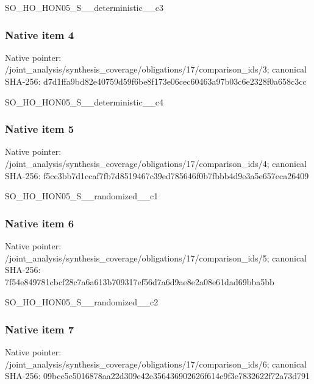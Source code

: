 \documentclass[10pt,a4paper]{article}
\begin{document}
\begingroup\raggedright\sloppy SO\_\allowbreak{}HO\_\allowbreak{}HON05\_\allowbreak{}S\_\allowbreak{}\_\allowbreak{}deterministic\_\allowbreak{}\_\allowbreak{}c3\par\endgroup

\subsubsection{Native item 4}
Native pointer: /joint\_\allowbreak{}analysis/synthesis\_\allowbreak{}coverage/obligations/17/comparison\_\allowbreak{}ids/3; canonical SHA-256: d7d1ffa9bd82e40759d59f6be8f173e06cec60463a97b03c6e2328f0a658c3cc

\begingroup\raggedright\sloppy SO\_\allowbreak{}HO\_\allowbreak{}HON05\_\allowbreak{}S\_\allowbreak{}\_\allowbreak{}deterministic\_\allowbreak{}\_\allowbreak{}c4\par\endgroup

\subsubsection{Native item 5}
Native pointer: /joint\_\allowbreak{}analysis/synthesis\_\allowbreak{}coverage/obligations/17/comparison\_\allowbreak{}ids/4; canonical SHA-256: f5cc3bb7d1ccaf7fb7d8519467c39ed785646f0b7fbbb4d9e3a5e657eca26409

\begingroup\raggedright\sloppy SO\_\allowbreak{}HO\_\allowbreak{}HON05\_\allowbreak{}S\_\allowbreak{}\_\allowbreak{}randomized\_\allowbreak{}\_\allowbreak{}c1\par\endgroup

\subsubsection{Native item 6}
Native pointer: /joint\_\allowbreak{}analysis/synthesis\_\allowbreak{}coverage/obligations/17/comparison\_\allowbreak{}ids/5; canonical SHA-256: 7f54e849781cbcf28c7a6a613b709317ef56d7a6d9ae8e2a08e61dad69bba5bb

\begingroup\raggedright\sloppy SO\_\allowbreak{}HO\_\allowbreak{}HON05\_\allowbreak{}S\_\allowbreak{}\_\allowbreak{}randomized\_\allowbreak{}\_\allowbreak{}c2\par\endgroup

\subsubsection{Native item 7}
Native pointer: /joint\_\allowbreak{}analysis/synthesis\_\allowbreak{}coverage/obligations/17/comparison\_\allowbreak{}ids/6; canonical SHA-256: 09bcc5c5016878aa22d309e42e356436902626f614e9f3e7832622f72a73d791
\end{document}
